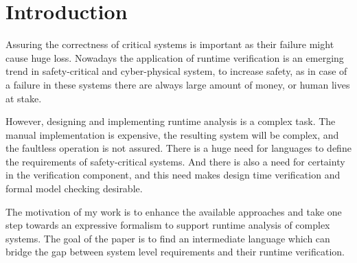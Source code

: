 \chapter{Introduction}
\label{chap:intro}



Assuring the correctness of critical systems is important as their failure might cause huge loss.
Nowadays the application of runtime verification is an emerging trend in safety-critical and cyber-physical system, to increase safety, as in case of a failure in these systems there are always large amount of money, or human lives at stake. 

However, designing and implementing runtime analysis is a complex task. The manual implementation is expensive, the resulting system will be complex, and the faultless operation is not assured.
There is a huge need for languages to define the requirements of safety-critical systems.
And there is also a need for certainty in the verification component, and this need makes design time verification and formal model checking desirable. 

The motivation of my work is to enhance the available approaches and take one step towards an expressive formalism to support runtime analysis of complex systems.
The goal of the paper is to find an intermediate language which can bridge the gap between system level requirements and their runtime verification.


